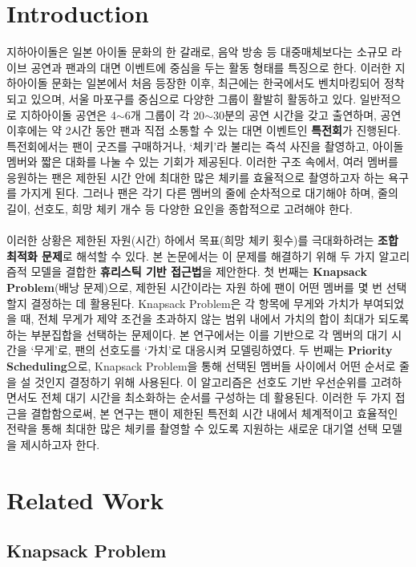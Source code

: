 \documentclass[12pt,hidelinks]{article}
\begin{document}
\section{Introduction}
지하아이돌은 일본 아이돌 문화의 한 갈래로, 음악 방송 등 대중매체보다는 소규모 라이브 공연과 팬과의 대면 이벤트에 중심을 두는 활동 형태를 특징으로 한다. 이러한 지하아이돌 문화는 일본에서 처음 등장한 이후, 최근에는 한국에서도 벤치마킹되어 정착되고 있으며, 서울 마포구를 중심으로 다양한 그룹이 활발히 활동하고 있다. 일반적으로 지하아이돌 공연은 4$\sim$6개 그룹이 각 20$\sim$30분의 공연 시간을 갖고 출연하며, 공연 이후에는 약 2시간 동안 팬과 직접 소통할 수 있는 대면 이벤트인 \textbf{특전회}가 진행된다. 특전회에서는 팬이 굿즈를 구매하거나, `체키'라 불리는 즉석 사진을 촬영하고, 아이돌 멤버와 짧은 대화를 나눌 수 있는 기회가 제공된다. 이러한 구조 속에서, 여러 멤버를 응원하는 팬은 제한된 시간 안에 최대한 많은 체키를 효율적으로 촬영하고자 하는 욕구를 가지게 된다. 그러나 팬은 각기 다른 멤버의 줄에 순차적으로 대기해야 하며, 줄의 길이, 선호도, 희망 체키 개수 등 다양한 요인을 종합적으로 고려해야 한다.
\\
\\
이러한 상황은 제한된 자원(시간) 하에서 목표(희망 체키 횟수)를 극대화하려는 \textbf{조합 최적화 문제}로 해석할 수 있다. 본 논문에서는 이 문제를 해결하기 위해 두 가지 알고리즘적 모델을 결합한 \textbf{휴리스틱 기반 접근법}을 제안한다. 첫 번째는 \textbf{Knapsack Problem}(배낭 문제)으로, 제한된 시간이라는 자원 하에 팬이 어떤 멤버를 몇 번 선택할지 결정하는 데 활용된다. Knapsack Problem은 각 항목에 무게와 가치가 부여되었을 때, 전체 무게가 제약 조건을 초과하지 않는 범위 내에서 가치의 합이 최대가 되도록 하는 부분집합을 선택하는 문제이다. 본 연구에서는 이를 기반으로 각 멤버의 대기 시간을 `무게'로, 팬의 선호도를 `가치'로 대응시켜 모델링하였다. 두 번째는 \textbf{Priority Scheduling}으로, Knapsack Problem을 통해 선택된 멤버들 사이에서 어떤 순서로 줄을 설 것인지 결정하기 위해 사용된다. 이 알고리즘은 선호도 기반 우선순위를 고려하면서도 전체 대기 시간을 최소화하는 순서를 구성하는 데 활용된다. 이러한 두 가지 접근을 결합함으로써, 본 연구는 팬이 제한된 특전회 시간 내에서 체계적이고 효율적인 전략을 통해 최대한 많은 체키를 촬영할 수 있도록 지원하는 새로운 대기열 선택 모델을 제시하고자 한다.

\section{Related Work}
\subsection{Knapsack Problem}
\end{document}
